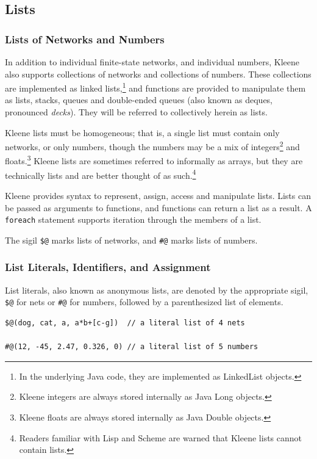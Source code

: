 \documentclass[letterpaper,12pt]{article}
\begin{document}
\vspace{0.5cm}

\subsection{Lists}


\subsubsection{Lists of Networks and Numbers}

In addition to individual finite-state networks, and individual numbers,
Kleene also supports collections of networks and collections of numbers.
These collections are implemented as linked lists,\footnote{In the
underlying Java code, they are implemented as LinkedList objects.} and
functions are provided to manipulate them as lists, stacks, queues and
double-ended queues (also known as deques, pronounced \emph{decks}).
They will be referred to collectively herein as lists.

Kleene lists must be homogeneous; that is, a single list must contain
only networks, or only numbers, though the numbers may be a mix of
integers\footnote{Kleene integers are always stored internally as Java
Long objects.} and floats.\footnote{Kleene floats are always stored
internally as Java Double objects.}  Kleene lists are sometimes referred
to informally as arrays, but they are technically lists and are better
thought of as such.\footnote{Readers familiar with Lisp and Scheme are
warned that Kleene lists cannot contain lists.}

Kleene provides syntax to represent, assign, access and manipulate lists.
Lists can be passed as arguments to functions, and functions can
return a list as a result.  A \texttt{foreach} statement supports
iteration through the members of a list.

The sigil \verb!$@! marks lists of networks, and \verb!#@! marks lists of
numbers. 

\subsubsection{List Literals, Identifiers, and Assignment}

List literals, also known as anonymous lists, are denoted by the
appropriate sigil, \verb!$@! for nets or \verb!#@! for numbers, followed
by a parenthesized list of elements.

\begin{Verbatim}[fontsize=\small]
$@(dog, cat, a, a*b+[c-g])  // a literal list of 4 nets

#@(12, -45, 2.47, 0.326, 0) // a literal list of 5 numbers
\end{Verbatim}
\end{document}
